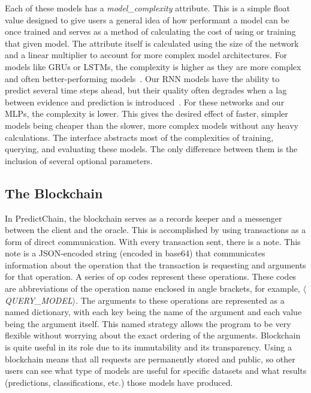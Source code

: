 \documentclass{ledger}
\begin{document}
Each of these models has a \textit{model\_complexity} attribute.  This is a simple float value designed to give users a
general idea of how performant a model can be once trained and serves as a method of calculating the cost of using or
training that given model.  The attribute itself is calculated using the size of the network and a linear multiplier to
account for more complex model architectures.  For models like GRUs or LSTMs, the complexity is higher as they are more
complex and often better-performing models~\cite{recurrentModeling}.  Our RNN models have the ability to predict several
time steps ahead, but their quality often degrades when a lag between evidence and prediction is introduced~\cite{weightGuessing}.
For these networks and our MLPs, the complexity is lower. This gives the desired effect of faster, simpler models being
cheaper than the slower, more complex models without any heavy calculations. The interface abstracts most of the complexities
of training, querying, and evaluating these models. The only difference between them is the inclusion of several optional
parameters.

\subsection{The Blockchain}

In PredictChain, the blockchain serves as a records keeper and a messenger between the client and the oracle. This is
accomplished by using transactions as a form of direct communication.  With every transaction sent, there is a note.
This note is a JSON-encoded string (encoded in base64) that communicates information about the operation that the
transaction is requesting and arguments for that operation.  A series of op codes represent these operations.
These codes are abbreviations of the operation name enclosed in angle brackets, for example,
$\langle$\textit{QUERY\_MODEL}$\rangle$. The arguments to these operations are represented as a named dictionary, with
each key being the name of the argument and each value being the argument itself.  This named strategy allows the program
to be very flexible without worrying about the exact ordering of the arguments.  Blockchain is quite useful in its role
due to its immutability and its transparency.  Using a blockchain means that all requests are permanently stored and public,
so other users can see what type of models are useful for specific datasets and what results (predictions, classifications, etc.)
those models have produced.
\end{document}
